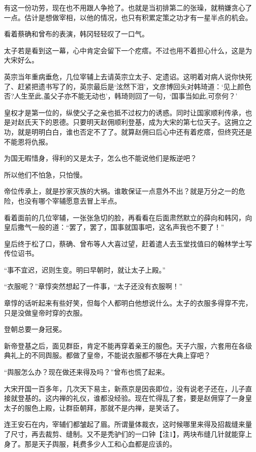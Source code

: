 有这一份功劳，现在也不用跟人争抢了。也就是当初排第二的张璪，就稍嫌贪心了一点。估计是想做宰相，以他的情况，也只有积累定策之功才有一星半点的机会。

看着蔡确和曾布的表演，韩冈轻轻叹了一口气。

太子若是看到这一幕，心中肯定会留下一个疙瘩。不过也用不着担心什么，这是为大宋好么。

英宗当年重病垂危，几位宰辅上去请英宗立太子、定遗诏。这明着对病人说你快死了、赶紧把遗书写了的，英宗最后是‘泫然下泪’，文彦博回头对韩琦道：‘见上颜色否?人生至此,虽父子亦不能无动也’，韩琦则回了一句，‘国事当如此,可奈何？’

皇权才是第一位的，纵使父子之亲也抵不过权力的诱惑。同时让国家顺利传承，也是对赵氏天下的恩德。只要明天赵佣顺利登基，成为大宋的第七位天子。这拥立之功，就是明明白白，谁也否定不了了。就算赵佣曰后心中还有着疙瘩，但终究还是不能恩将仇报。

为国无暇惜身，得利的又是太子，怎么也不能说他们是叛逆吧？

所以他们不怕急，只怕慢。

帝位传承上，就是抄家灭族的大祸。谁敢保证一点意外不出？就是万分之一的危险，也没有哪个宰辅愿意去冒上半点。

看着面前的几位宰辅，一张张急切的脸，再看看在后面肃然默立的薛向和韩冈，向皇后撒气一般的道：“罢了，罢了，国事就国事吧，这名声我也不要了！”

皇后终于松了口，蔡确、曾布等人大喜过望，赶着遣人去玉堂找值曰的翰林学士写传位诏书。

“事不宜迟，迟则生变。明曰早朝时，就让太子上殿。”

“衣服呢？”章惇突然想起了一件事，“太子还没有衣服啊！”

章惇的话听起来有些好笑，但每个人都明白他想说什么。太子的衣服多得穿不完，只是没做皇帝时穿的衣服。

登朝总要一身冠冕。

新帝登基之后，面见群臣，肯定不能再穿着亲王的服色。天子六服，六套用在各级典礼上的不同舆服。都做了皇帝，不能说衣服都不够在大典上穿吧？

“舆服怎么办？现在做还来得及吗？”曾布也慌了起来。

大宋开国一百多年，几次天下易主，新燕京是因丧即位，没有说老子还在，儿子直接就登基的。这内禅的礼仪，谁都没经验。现在忙得乱了套，要是赵佣穿了一身皇太子的服色上殿，让群臣朝拜，那就不是内禅，是笑话了。

连王安石在内，宰辅们都皱起了眉。所谓量体裁衣，这时候哪里来得及招裁缝来量了尺寸，再去裁剪、缝制。又不是秃驴们的一口钟【注1】，两块布缝几针就能穿上身了。那是天子舆服，耗费多少人工和心血都是应该的。

